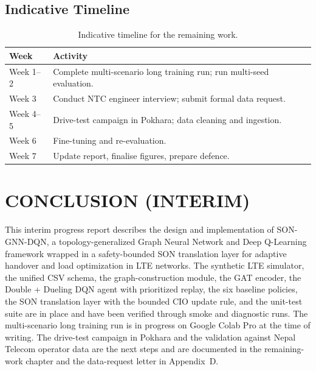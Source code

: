 \documentclass[12pt,a4paper,oneside]{report}
\begin{document}
\section{Indicative Timeline}

\begin{table}[H]
    \centering
    \caption{Indicative timeline for the remaining work.}
    \small
    \begin{tabularx}{\textwidth}{lX}
        \toprule
        \textbf{Week} & \textbf{Activity}\\
        \midrule
        Week 1--2 & Complete multi-scenario long training run; run
        multi-seed evaluation.\\
        Week 3   & Conduct NTC engineer interview; submit formal data
        request.\\
        Week 4--5 & Drive-test campaign in Pokhara; data cleaning and
        ingestion.\\
        Week 6   & Fine-tuning and re-evaluation.\\
        Week 7   & Update report, finalise figures, prepare defence.\\
        \bottomrule
    \end{tabularx}
\end{table}

\chapter{CONCLUSION (INTERIM)}

This interim progress report describes the design and implementation of
SON-GNN-DQN, a topology-generalized Graph Neural Network and Deep
Q-Learning framework wrapped in a safety-bounded SON translation layer
for adaptive handover and load optimization in LTE networks. The
synthetic LTE simulator, the unified CSV schema, the graph-construction
module, the GAT encoder, the Double + Dueling DQN agent with prioritized
replay, the six baseline policies, the SON translation layer with the
bounded CIO update rule, and the unit-test suite are in place and have
been verified through smoke and diagnostic runs. The multi-scenario
long training run is in progress on Google Colab Pro at the time of
writing. The drive-test campaign in Pokhara and the validation against
Nepal Telecom operator data are the next steps and are documented in
the remaining-work chapter and the data-request letter in Appendix~D.
\end{document}
